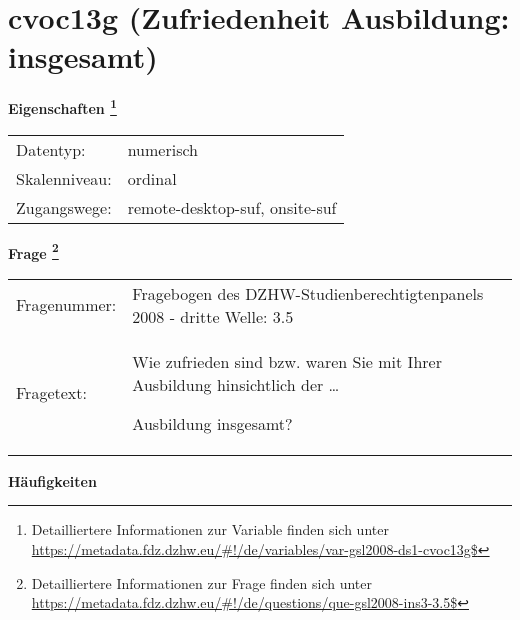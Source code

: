 
    \setcounter{footnote}{0}

    \vspace*{-1.8cm}
	\section{cvoc13g (Zufriedenheit Ausbildung: insgesamt)}
	\label{section:cvoc13g}



    \vspace*{0.5cm}
    \noindent\textbf{Eigenschaften
	\footnote{Detailliertere Informationen zur Variable finden sich unter
		\url{https://metadata.fdz.dzhw.eu/\#!/de/variables/var-gsl2008-ds1-cvoc13g$}}}\\
	\begin{tabularx}{\hsize}{@{}lX}
	Datentyp: & numerisch \\
	Skalenniveau: & ordinal \\
	Zugangswege: &
	  remote-desktop-suf, 
	  onsite-suf
 \\
    \end{tabularx}



				\vspace*{0.5cm}
                \noindent\textbf{Frage
	                \footnote{Detailliertere Informationen zur Frage finden sich unter
		              \url{https://metadata.fdz.dzhw.eu/\#!/de/questions/que-gsl2008-ins3-3.5$}}}\\
				\begin{tabularx}{\hsize}{@{}lX}
					Fragenummer: &
					  Fragebogen des DZHW-Studienberechtigtenpanels 2008 - dritte Welle:
					  3.5
 \\
					Fragetext: & Wie zufrieden sind bzw. waren Sie mit Ihrer Ausbildung hinsichtlich der …\par  Ausbildung insgesamt? \\
				\end{tabularx}





        		\vspace*{0.5cm}
                \noindent\textbf{Häufigkeiten}

